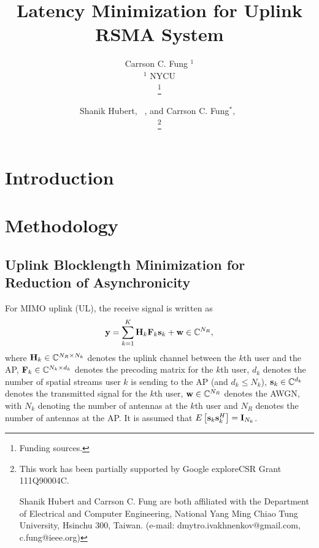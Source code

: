 \documentclass[a4paper, 12pt, onecolumn, journal, twoside, draftclsnofoot]{IEEEtran}
\title{\vspace{-0.2em} \huge Latency Minimization for Uplink RSMA System}
\author{Carrson C. Fung $^1$ \\ %
$^1$ NYCU  \\
\thanks{Funding sources.}
}
\author{Shanik Hubert, ~\IEEEmembership{Student Member,~IEEE}, and Carrson C. Fung$^*$,~\IEEEmembership{Member,~IEEE} \\
\thanks{This work has been partially supported by Google exploreCSR Grant 111Q90004C.

Shanik Hubert and Carrson C. Fung  are both affiliated with the Department of Electrical and Computer Engineering, National Yang Ming Chiao Tung University, Hsinchu 300, Taiwan. (e-mail: dmytro.ivakhnenkov@gmail.com, c.fung@ieee.org)}
}
\begin{document}
\maketitle

\begin{abstract}
\end{abstract}

\begin{IEEEkeywords}
\end{IEEEkeywords}

\section{Introduction}	\label{intro}


  
\section{Methodology} \label{sec_meth}

\subsection{Uplink Blocklength Minimization for Reduction of Asynchronicity}
For MIMO uplink (UL), the receive signal is written as
\begin{equation*}
	{\bf y} = \sum_{k=1}^K  {\bf H}_k {\bf F}_k {\bf s}_k + {\bf w} \in \mathbb{C}^{N_R},
\end{equation*}
where 
${\bf H}_k \in \mathbb{C}^{N_R \times N_k}$ denotes the uplink channel between the $k$th user and the AP, ${\bf F}_k \in \mathbb{C}^{N_k \times d_k}$ denotes the precoding matrix for the $k$th user, $d_k$ denotes the number of spatial streams user $k$ is sending to the AP (and $d_k \leq N_k$), ${\bf s}_k \in \mathbb{C}^{d_k}$ denotes the transmitted signal for the $k$th user, ${\bf w} \in \mathbb{C}^{N_R}$  denotes the AWGN, with $N_k$ denoting the number of antennas at the $k$th user and $N_R$ denotes the number of antennas at the AP.  It is assumed that $E \left[ {\bf s}_k {\bf s}_k^H \right] = {\bf I}_{N_k}$. \\
\end{document}
